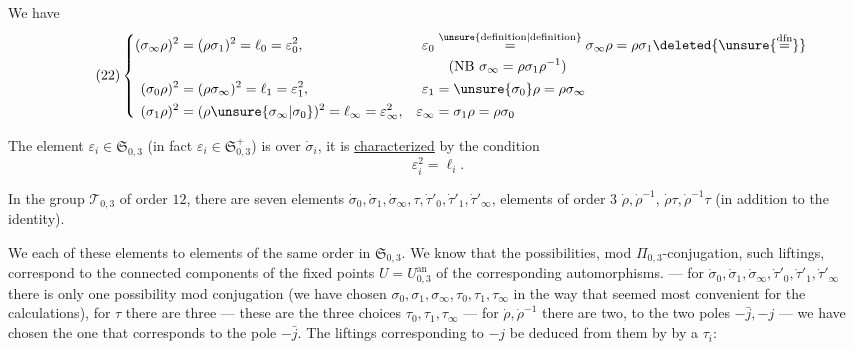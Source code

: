 

We have
\[
\tag{22}
\left\{\begin{aligned}
(\sigma_\infty\rho)^2&=(\rho\sigma_1)^2=\ell_0=\varepsilon_0^2,&
\varepsilon_0&\overset{\unsure{\text{definition}|\text{definition}}}{=}\sigma_\infty\rho=\rho\sigma_1\deleted{\unsure{\overset{\mathrm{dfn}}{=}}}
\\[-1pt]&&&\quad(\mathrm{NB}\ \sigma_\infty=\rho\sigma_1\rho^{-1})\\
(\sigma_0\rho)^2&=(\rho\sigma_\infty)^2=\ell_1=\varepsilon_1^2,&
\varepsilon_1&=\unsure{\sigma_0}\rho=\rho\sigma_\infty\\
(\sigma_1\rho)^2&=(\rho\unsure{\sigma_\infty|\sigma_0})^2=\ell_\infty=\varepsilon_\infty^2,&
\varepsilon_\infty&=\sigma_1\rho=\rho\sigma_0
\end{aligned}\right.
\]

The element $\varepsilon_i\in\mathfrak S_{0,3}$
(in fact $\varepsilon_i\in\mathfrak S_{0,3}^{+}$) is over $\dot\sigma_i$,
it is \uline{characterized} by the condition
\[
\varepsilon_i^2=\ell_i.
\]

In the group $\mathcal T_{0,3}$ of order $12$, there are seven  elements
$\dot\sigma_0,\dot\sigma_1,\dot\sigma_\infty,\tau,\dot\tau'_0,\dot\tau'_1,\dot\tau'_\infty$,
  elements of order $3$
$\dot\rho,\dot\rho^{-1}$, 
$\dot\rho\tau,\dot\rho^{-1}\tau$ (in addition to the identity).

We   each of these elements to elements of the same order in
$\mathfrak S_{0,3}$.
We know that the possibilities, mod $\Pi_{0,3}$-conjugation,  such liftings,
correspond to the connected components of the fixed points  $U=U_{0,3}^{\mathrm{an}}$
of the corresponding  automorphisms. --- for
$\dot\sigma_0,\dot\sigma_1,\dot\sigma_\infty,\dot\tau'_0,\dot\tau'_1,\dot\tau'_\infty$
there is only one possibility mod conjugation (we have chosen
$\sigma_0,\sigma_1,\sigma_\infty,\tau_0,\tau_1,\tau_\infty$
in the way that seemed most convenient for the calculations),
for $\tau$ there are three --- these are the three choices $\tau_0,\tau_1,\tau_\infty$
--- for $\dot\rho,\dot\rho^{-1}$ there are two,
 to the two poles $-\bar j,-j$ --- we have chosen the one that
corresponds to the pole $-\bar j$.
The liftings corresponding to $-j$  be deduced from them by  by a $\tau_i$:

